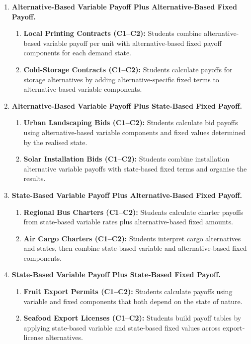\begin{enumerate}
		\item \textbf{Alternative-Based Variable Payoff Plus Alternative-Based Fixed Payoff.}
		\begin{enumerate}
			\item \textbf{Local Printing Contracts (C1--C2):} Students combine alternative-based variable payoff per unit with alternative-based fixed payoff components for each demand state.
			\item \textbf{Cold-Storage Contracts (C1--C2):} Students calculate payoffs for storage alternatives by adding alternative-specific fixed terms to alternative-based variable components.
		\end{enumerate}

		\item \textbf{Alternative-Based Variable Payoff Plus State-Based Fixed Payoff.}
		\begin{enumerate}
			\item \textbf{Urban Landscaping Bids (C1--C2):} Students calculate bid payoffs using alternative-based variable components and fixed values determined by the realised state.
			\item \textbf{Solar Installation Bids (C1--C2):} Students combine installation alternative variable payoffs with state-based fixed terms and organise the results.
		\end{enumerate}

		\item \textbf{State-Based Variable Payoff Plus Alternative-Based Fixed Payoff.}
		\begin{enumerate}
			\item \textbf{Regional Bus Charters (C1--C2):} Students calculate charter payoffs from state-based variable rates plus alternative-based fixed amounts.
			\item \textbf{Air Cargo Charters (C1--C2):} Students interpret cargo alternatives and states, then combine state-based variable and alternative-based fixed components.
		\end{enumerate}

		\item \textbf{State-Based Variable Payoff Plus State-Based Fixed Payoff.}
		\begin{enumerate}
			\item \textbf{Fruit Export Permits (C1--C2):} Students calculate payoffs using variable and fixed components that both depend on the state of nature.
			\item \textbf{Seafood Export Licenses (C1--C2):} Students build payoff tables by applying state-based variable and state-based fixed values across export-license alternatives.
		\end{enumerate}


\end{enumerate}

